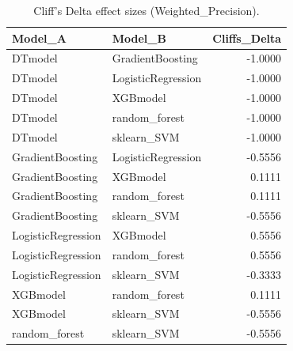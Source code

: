 \begin{table}[t]
\centering
\begin{tabular}{llr}
\toprule
Model_A & Model_B & Cliffs_Delta \\
\midrule
DTmodel & GradientBoosting & -1.0000 \\
DTmodel & LogisticRegression & -1.0000 \\
DTmodel & XGBmodel & -1.0000 \\
DTmodel & random_forest & -1.0000 \\
DTmodel & sklearn_SVM & -1.0000 \\
GradientBoosting & LogisticRegression & -0.5556 \\
GradientBoosting & XGBmodel & 0.1111 \\
GradientBoosting & random_forest & 0.1111 \\
GradientBoosting & sklearn_SVM & -0.5556 \\
LogisticRegression & XGBmodel & 0.5556 \\
LogisticRegression & random_forest & 0.5556 \\
LogisticRegression & sklearn_SVM & -0.3333 \\
XGBmodel & random_forest & 0.1111 \\
XGBmodel & sklearn_SVM & -0.5556 \\
random_forest & sklearn_SVM & -0.5556 \\
\bottomrule
\end{tabular}
\caption{Cliff's Delta effect sizes (Weighted_Precision).}
\label{tab:cliffs_Weighted_Precision}
\end{table}